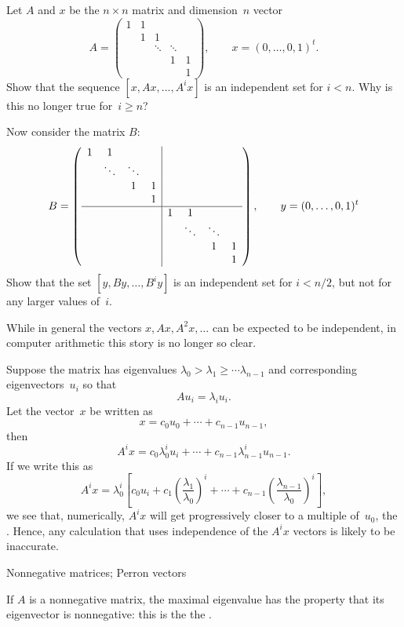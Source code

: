 \begin{exercise}
  Let $A$ and $x$ be the $n\times n$ matrix and dimension~$n$ vector
  \[ 
  A = \begin{pmatrix}
    1&1\\ &1&1\\ &&\ddots&\ddots\\ &&&1&1\\&&&&1
  \end{pmatrix},\qquad
  x =  (0,\ldots,0,1)^t.
  \]
  Show that the sequence $[x,Ax,\ldots,A^ix]$ is an independent set
  for $i<n$. Why is this no longer true for~$i\geq n$?

  Now consider the matrix $B$:
  \[ B=\left(
  \begin{array}{cccc|cccc}
    1&1&&\\ &\ddots&\ddots&\\ &&1&1\\ &&&1\\ \hline
    &&&&1&1\\ &&&&&\ddots&\ddots\\ &&&&&&1&1\\ &&&&&&&1
  \end{array}\right),\qquad
  y = (0,\ldots,0,1)^t
  \]
  Show that the set $[y,By,\ldots,B^iy]$ is an independent set for
  $i<n/2$, but not for any larger values of~$i$.
\end{exercise}

While in general the vectors $x,Ax,A^2x,\ldots$ can be expected to be
independent, in computer arithmetic this story is no longer so clear.

Suppose the matrix has eigenvalues $\lambda_0>\lambda_1\geq\cdots
\lambda_{n-1}$ and corresponding eigenvectors~$u_i$ so that
\[ Au_i=\lambda_i u_i. \]
Let the vector~$x$ be written as
\[ x=c_0u_0+\cdots +c_{n-1}u_{n-1}, \]
then 
\[ A^ix = c_0\lambda_0^iu_i+\cdots +c_{n-1}\lambda_{n-1}^iu_{n-1}. \]
If we write this as 
\[ A^ix = \lambda_0^i\left[
    c_0u_i+c_1\left(\frac{\lambda_1}{\lambda_0}\right)^i+
    \cdots +c_{n-1}\left(\frac{\lambda_{n-1}}{\lambda_0}\right)^i
    \right],
\]
we see that, numerically, $A^ix$ will get progressively closer
to a multiple of~$u_0$, the . Hence,
any calculation that uses independence of the $A^ix$ vectors is likely
to be inaccurate.

 {Nonnegative matrices; Perron vectors}
\label{app:perron}

If $A$ is a nonnegative matrix, the maximal eigenvalue has the
property that its eigenvector is nonnegative: this is the the
.

